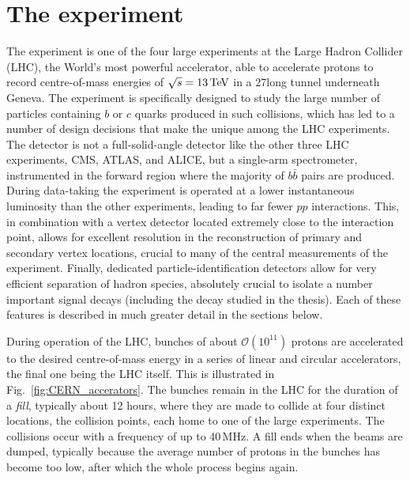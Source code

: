 

\chapter{The \lhcb experiment}
\label{ch:3-detector}


The \lhcb experiment is one of the four large experiments at the Large Hadron Collider (LHC), the World's most powerful accelerator, able to accelerate protons to record centre-of-mass energies of $\sqrt{s}=13\text{\,Te\kern -0.1em V}$ in a 27\km long tunnel underneath Geneva. The \lhcb experiment is specifically designed to study the large number of particles containing $b$ or $c$ quarks produced in such collisions, which has led to a number of design decisions that make the \lhcb unique among the LHC experiments. The \lhcb detector is not a full-solid-angle detector like the other three LHC experiments, CMS, ATLAS, and ALICE, but a single-arm spectrometer, instrumented in the forward region where the majority of $b\bar b$ pairs are produced. During data-taking the experiment is operated at a lower instantaneous luminosity than the other experiments, leading to far fewer $pp$ interactions. This, in combination with a vertex detector located extremely close to the interaction point, allows for excellent resolution in the reconstruction of primary and secondary vertex locations, crucial to many of the central measurements of the experiment. Finally, dedicated particle-identification detectors allow for very efficient separation of hadron species, absolutely crucial to isolate a number important signal decays (including the \BtoDK decay studied in the thesis). Each of these features is described in much greater detail in the sections below.



During operation of the LHC, bunches of about $\mathcal O(10^{11})$ protons are accelerated to the desired centre-of-mass energy in a series of linear and circular accelerators, the final one being the LHC itself. This is illustrated in Fig.~\ref{fig:CERN_accerators}. The bunches remain in the LHC for the duration of a \emph{fill}, typically about 12 hours, where they are made to collide at four distinct locations, the collision points, each home to one of the large experiments. The collisions occur with a frequency of up to 40\,MHz. A fill ends when the beams are dumped, typically because the average number of protons in the bunches has become too low, after which the whole process begins again.

